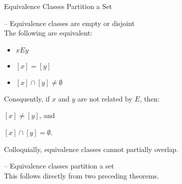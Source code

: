 \documentclass[style=sailor,size=12pt]{powerdot}
\begin{document}
\begin{slide}[bm=,toc=]{Equivalence Classes Partition a Set}
\begin{thm}{ -- Equivalence classes are empty or disjoint}~\\
The following are equivalent:
\begin{itemize}
\item $xEy$ 
\item $[x] = [y]$ 
\item $[x] \cap [y] \neq \emptyset$ 
\end{itemize}
Consquently, if $x$ and $y$ are not related by $E$, then:
\item $[x] \neq [y]$, and
\item $[x] \cap [y] = \emptyset$.
\end{thm}
Colloquially, equivalence classes cannot partially overlap. 
\vspace{5mm}
\begin{thm}{ -- Equivalence classes partition a set}~\\
This follows directly from two preceding theorems. 
\end{thm}
\end{slide}
\end{document}
